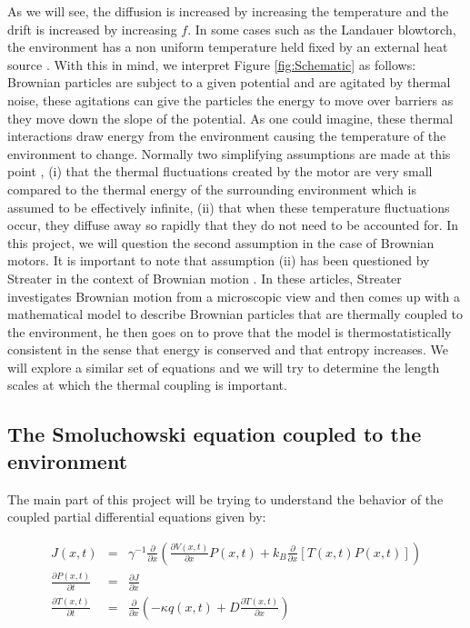\documentclass[11pt]{article} %
\begin{document}
As we will see, the diffusion is increased by increasing the temperature and the drift is increased by increasing $f$. In some cases such as the Landauer blowtorch, the environment has a non uniform temperature held fixed by an external heat source \cite{Landauer1988}. With this in mind, we interpret Figure \ref{fig:Schematic} as follows: Brownian particles are subject to a given potential and are agitated by thermal noise, these agitations can give the particles the energy to move over barriers as they move down the slope of the potential. As one could imagine, these thermal interactions draw energy from the environment causing the temperature of the environment to change. Normally two simplifying assumptions are made at this point \cite{Reimann2001}, (i) that the thermal fluctuations created by the motor are very small compared to the thermal energy of the surrounding environment which is assumed to be effectively infinite, (ii) that when these temperature fluctuations occur, they diffuse away so rapidly that they do not need to be accounted for. In this project, we will question the second assumption in the case of Brownian motors. It is important to note that assumption (ii) has been questioned by Streater in the context of Brownian motion \cite{Streater1997, Streater1997a}. In these articles, Streater investigates Brownian motion from a microscopic view and then comes up with a mathematical model to describe Brownian particles that are thermally coupled to the environment, he then goes on to prove that the model is thermostatistically consistent in the sense that energy is conserved and that entropy increases. We will explore a similar set of equations and we will try to determine the length scales at which the thermal coupling is important.
 
\subsection{The Smoluchowski equation coupled to the environment} \label{Smoluchowski}

The main part of this project will be trying to understand the behavior of the coupled partial differential equations given by:

\begin{eqnarray}
J(x, t) &=& \gamma^{-1} \frac{\partial}{\partial x} \left ( \frac{\partial V(x, t)}{\partial x} P(x, t) + k_B \frac{\partial}{\partial x} \left [T(x, t) P(x, t) \right] \right )  \\
\frac{\partial P(x, t)}{\partial t} &=& \frac{\partial J}{\partial x} \label{eqn:Smoluchowski} \\
\frac{\partial T(x, t)}{\partial t} &=& \frac{\partial}{\partial x} \left ( -\kappa q(x, t) + D \frac{\partial T(x, t)}{\partial x} \right ) \label{eqn:TemperatureEvolution}
\end{eqnarray} 
\end{document}
